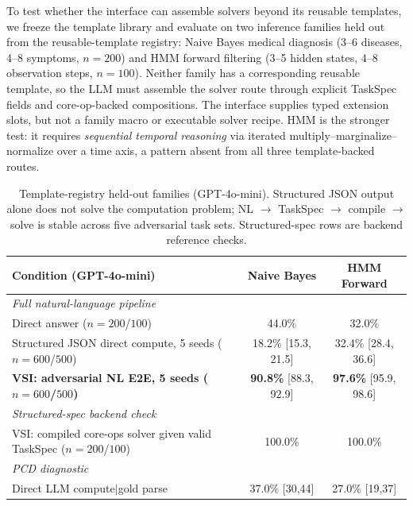 \documentclass{article}
\newcommand{\taskspec}{TaskSpec}
\begin{document}
To test whether the interface can assemble solvers beyond its reusable templates, we freeze the template library and evaluate on two inference families held out from the reusable-template registry: Naive Bayes medical diagnosis (3--6 diseases, 4--8 symptoms, $n{=}200$) and HMM forward filtering (3--5 hidden states, 4--8 observation steps, $n{=}100$).
Neither family has a corresponding reusable template, so the LLM must assemble the solver route through explicit \taskspec{} fields and core-op-backed compositions.
The interface supplies typed extension slots, but not a family macro or executable solver recipe.
HMM is the stronger test: it requires \emph{sequential temporal reasoning} via iterated multiply--marginalize--normalize over a time axis, a pattern absent from all three template-backed routes.

\begin{table}[t]
\centering
\small
\caption{Template-registry held-out families (GPT-4o-mini). Structured JSON output alone does not solve the computation problem; NL $\rightarrow$ \taskspec{} $\rightarrow$ compile $\rightarrow$ solve is stable across five adversarial task sets. Structured-spec rows are backend reference checks.}
\label{tab:held_out}
\begin{tabular}{@{}lcc@{}}
\toprule
Condition (GPT-4o-mini) & Naive Bayes & HMM Forward \\
\midrule
\multicolumn{3}{l}{\textit{Full natural-language pipeline}} \\
Direct answer ($n{=}200$/$100$) & 44.0\% & 32.0\% \\
Structured JSON direct compute, 5 seeds ($n{=}600$/$500$) & 18.2\% {\scriptsize [15.3, 21.5]} & 32.4\% {\scriptsize [28.4, 36.6]} \\
\textbf{VSI: adversarial NL E2E, 5 seeds ($n{=}600$/$500$)} & \textbf{90.8\%} {\scriptsize [88.3, 92.9]} & \textbf{97.6\%} {\scriptsize [95.9, 98.6]} \\
\midrule
\multicolumn{3}{l}{\textit{Structured-spec backend check}} \\
VSI: compiled core-ops solver given valid \taskspec{} ($n{=}200$/$100$) & 100.0\% & 100.0\% \\
\midrule
\multicolumn{3}{l}{\textit{PCD diagnostic}} \\
Direct LLM compute$\mid$gold parse & 37.0\% {\scriptsize [30,44]} & 27.0\% {\scriptsize [19,37]} \\
\bottomrule
\end{tabular}
\end{table}
\end{document}
